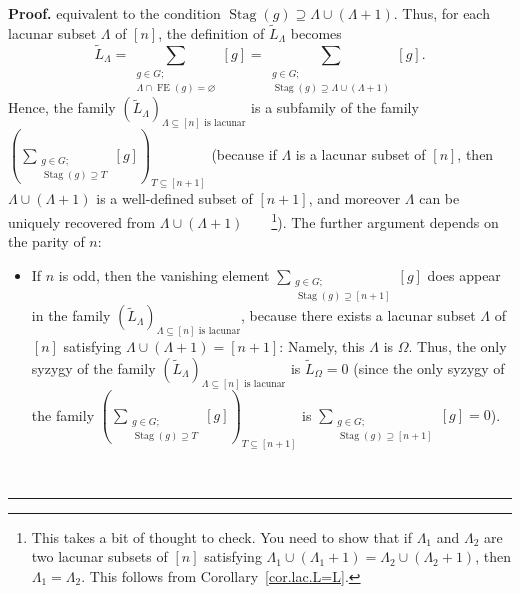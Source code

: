 \documentclass[numbers=enddot,12pt,final,onecolumn,notitlepage]{scrartcl}%
\theoremstyle{definition}
\newenvironment{proof}[1][Proof]{\noindent\textbf{#1.} }{\ \rule{0.5em}{0.5em}}
\newenvironment{verlong}{}{}
\let\sumnonlimits\sum
\renewcommand{\sum}{\sumnonlimits\limits}
\begin{document}
\begin{verlong}
\begin{proof}
equivalent to the condition $\operatorname*{Stag}\left(  g\right)
\supseteq\Lambda\cup\left(  \Lambda+1\right)  $. Thus, for each lacunar subset
$\Lambda$ of $\left[  n\right]  $, the definition of $\widetilde{L}_{\Lambda}$
becomes%
\[
\widetilde{L}_{\Lambda}=\sum_{\substack{g\in G;\\\Lambda\cap\operatorname*{FE}%
\left(  g\right)  =\varnothing}}\left[  g\right]  =\sum_{\substack{g\in
G;\\\operatorname*{Stag}\left(  g\right)  \supseteq\Lambda\cup\left(
\Lambda+1\right)  }}\left[  g\right]  .
\]
Hence, the family $\left(  \widetilde{L}_{\Lambda}\right)  _{\Lambda
\subseteq\left[  n\right]  \text{ is lacunar}}$ is a subfamily of the family
$\left(  \sum_{\substack{g\in G;\\\operatorname*{Stag}\left(  g\right)
\supseteq T}}\left[  g\right]  \right)  _{T\subseteq\left[  n+1\right]  }$
(because if $\Lambda$ is a lacunar subset of $\left[  n\right]  $, then
$\Lambda\cup\left(  \Lambda+1\right)  $ is a well-defined subset of $\left[
n+1\right]  $, and moreover $\Lambda$ can be uniquely recovered from
$\Lambda\cup\left(  \Lambda+1\right)  $\ \ \ \ \footnote{This takes a bit of
thought to check. You need to show that if $\Lambda_{1}$ and $\Lambda_{2}$ are
two lacunar subsets of $\left[  n\right]  $ satisfying $\Lambda_{1}\cup\left(
\Lambda_{1}+1\right)  =\Lambda_{2}\cup\left(  \Lambda_{2}+1\right)  $, then
$\Lambda_{1}=\Lambda_{2}$. This follows from
Corollary~\ref{cor.lac.L=L}.}). The further
argument depends on the parity of $n$:

\begin{itemize}
\item If $n$ is odd, then the vanishing element $\sum_{\substack{g\in
G;\\\operatorname*{Stag}\left(  g\right)  \supseteq\left[  n+1\right]
}}\left[  g\right]  $ does appear in the family $\left(  \widetilde{L}%
_{\Lambda}\right)  _{\Lambda\subseteq\left[  n\right]  \text{ is lacunar}}$,
because there exists a lacunar subset $\Lambda$ of $\left[  n\right]  $
satisfying $\Lambda\cup\left(  \Lambda+1\right)  =\left[  n+1\right]  $:
Namely, this $\Lambda$ is $\Omega$. Thus, the only syzygy of the family
$\left(  \widetilde{L}_{\Lambda}\right)  _{\Lambda\subseteq\left[  n\right]
\text{ is lacunar}}$ is $\widetilde{L}_{\Omega}=0$ (since the only syzygy of
the family $\left(  \sum_{\substack{g\in G;\\\operatorname*{Stag}\left(
g\right)  \supseteq T}}\left[  g\right]  \right)  _{T\subseteq\left[
n+1\right]  }$ is $\sum_{\substack{g\in G;\\\operatorname*{Stag}\left(
g\right)  \supseteq\left[  n+1\right]  }}\left[  g\right]  =0$).


\end{itemize}
\end{proof}
\end{verlong}
\end{document}
